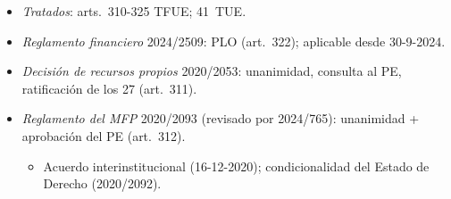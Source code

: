\documentclass{article}
\begin{document}
\begin{columnas}
\begin{itemize}
\item \emph{Tratados}: arts.~310-325 TFUE; 41~TUE.
\item \emph{Reglamento financiero} 2024/2509: PLO (art.~322); aplicable desde 30-9-2024.
\item \emph{Decisión de recursos propios} 2020/2053: unanimidad, consulta al PE, ratificación de los 27 (art.~311).
\item \emph{Reglamento del MFP} 2020/2093 (revisado por 2024/765): unanimidad + aprobación del PE (art.~312).
  \begin{itemize}
  \item Acuerdo interinstitucional (16-12-2020); condicionalidad del Estado de Derecho (2020/2092).
  \end{itemize}
\end{itemize}


\end{columnas}
\end{document}

